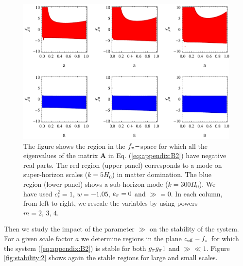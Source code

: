 \begin{figure}[tb]
\centering
\includegraphics[width=\textwidth]{figures/chapter-ade/stability.pdf} 
\caption{The figure shows the region in the $ \ff-$space for which all the eigenvalues of the matrix $ \mathbf{A} $ in Eq. (\ref{eq:appendix:B2}) have negative real parts. The red region (upper panel) corresponds to a mode on super-horizon scales ($k=5 H_0$) in matter domination. The blue region (lower panel) shows a sub-horizon mode  ($ k=300 H_0 $). We have used $c_s^2 = 1$, $w=-1.05$, $\aa=0$ and $\gg=0$. In each column, from left to right, we rescale the variables by using powers $ m=2,\,3,\,4 $.}
\label{fig:stability}
\end{figure}

Then we study the impact of the parameter $ \gg $ on the stability of the system. For a given scale factor $ a $ we determine regions in the plane $ \ceff-\ff $ for which the system (\ref{eq:appendix:B2}) is stable for both $ \gg \mug 1 $ and $ \gg \ll 1 $. Figure \ref{fig:stability:2} shows again the stable regions for large and small scales. 


